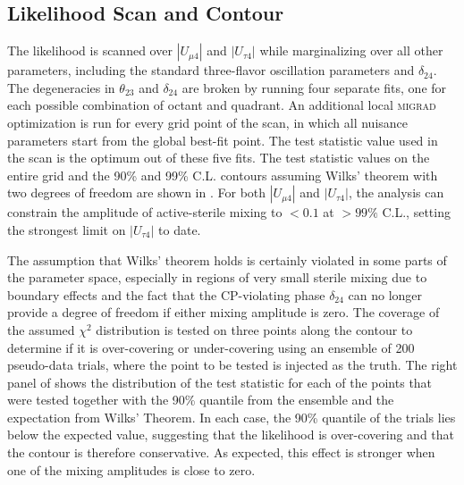 \subsection{Likelihood Scan and Contour}
The likelihood is scanned over $|U_{\mu 4}|$ and $|U_{\tau 4}|$ while marginalizing over all other parameters, including the standard three-flavor oscillation parameters and $\delta_{24}$.
The degeneracies in $\theta_{23}$ and $\delta_{24}$ are broken by running four separate fits, one for each possible combination of octant and quadrant.
An additional local \textsc{migrad} optimization is run for every grid point of the scan, in which all nuisance parameters start from the global best-fit point.
The test statistic value used in the scan is the optimum out of these five fits.
The test statistic values on the entire grid and the 90\% and 99\% C.L.
contours assuming Wilks' theorem with two degrees of freedom are shown in .
For both $|U_{\mu 4}|$ and $|U_{\tau 4}|$, the analysis can constrain the amplitude of active-sterile mixing to $<0.1$ at $>99\%$ C.L., setting the strongest limit on $|U_{\tau 4}|$ to date.

The assumption that Wilks' theorem holds is certainly violated in some parts of the parameter space, especially in regions of very small sterile mixing due to boundary effects and the fact that the CP-violating phase $\delta_{24}$ can no longer provide a degree of freedom if either mixing amplitude is zero.
The coverage of the assumed $\chi^2$ distribution is tested on three points along the contour to determine if it is over-covering or under-covering using an ensemble of 200 pseudo-data trials, where the point to be tested is injected as the truth.
The right panel of  shows the distribution of the test statistic for each of the points that were tested together with the 90\% quantile from the ensemble and the expectation from Wilks' Theorem.
In each case, the 90\% quantile of the trials lies below the expected value, suggesting that the likelihood is over-covering and that the contour is therefore conservative.
As expected, this effect is stronger when one of the mixing amplitudes is close to zero.

%     

